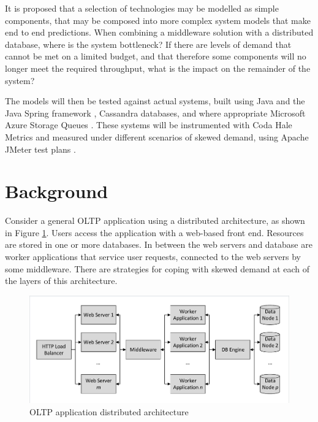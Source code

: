 \documentclass[runningheads]{llncs}
\begin{document}
It is proposed that a selection of technologies may be modelled as simple components, that may be composed into more complex system models that make end to end predictions.  When combining a middleware solution with a distributed database, where is the system bottleneck?  If there are levels of demand that cannot be met on a limited budget, and that therefore some components will no longer meet the required throughput, what is the impact on the remainder of the system?

The models will then be tested against actual systems, built using Java and the Java Spring framework \cite{RN1076}, Cassandra \cite{RN1050}\cite{RN1075} databases, and where appropriate Microsoft Azure Storage Queues \cite{RN1072}.  These systems will be instrumented with Coda Hale Metrics \cite{RN1079} and measured under different scenarios of skewed demand, using Apache JMeter test plans \cite{RN1074}.

%
%

\section{Background}\label{sec:background}

Consider a general OLTP application using a distributed architecture, as shown in Figure \ref{figure:oltpapplication}.  Users access the application with a web-based front end.  Resources are stored in one or more databases.  In between the web servers and database are worker applications that service user requests, connected to the web servers by some middleware.  There are strategies for coping with skewed demand at each of the layers of this architecture.

\begin{figure}
	\caption{OLTP application distributed architecture}
	\label{figure:oltpapplication}
	\centering
	\includegraphics[trim = 5 5 5 5, clip, width=\textwidth]{img/application}
\end{figure}
\end{document}
